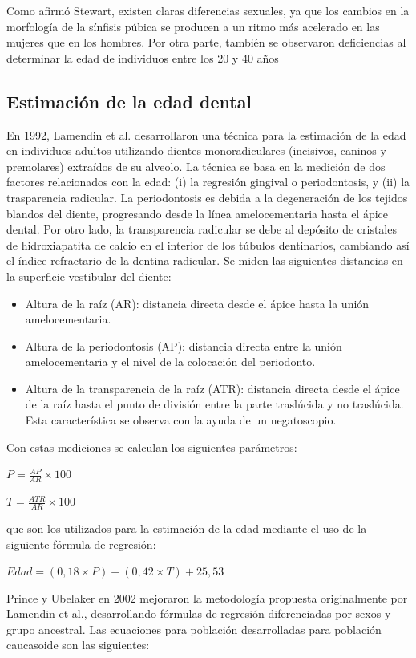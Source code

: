 \documentclass[a4paper,11pt]{article}
\begin{document}
Como afirmó Stewart, existen claras diferencias sexuales, ya que los cambios en la morfología de la sínfisis púbica se producen a un ritmo más acelerado en las mujeres que en los hombres. Por otra parte, también se observaron deficiencias al determinar la edad de individuos entre los 20 y 40 años \cite{hanihara1978estimation, suchey1979problems}
\subsection{Estimación de la edad dental}
En 1992, Lamendin et al. desarrollaron una técnica para la estimación de la edad en individuos adultos utilizando dientes monoradiculares (incisivos, caninos y premolares) extraídos de su alveolo. La técnica se basa en la medición de dos factores relacionados con la edad: (i) la regresión gingival o periodontosis, y (ii) la trasparencia radicular. La periodontosis es debida a la degeneración de los tejidos blandos del diente, progresando desde la línea amelocementaria hasta el ápice dental. Por otro lado, la transparencia radicular se debe al depósito de cristales de hidroxiapatita de calcio en el interior de los túbulos dentinarios, cambiando así el índice refractario de la dentina radicular.
Se miden las siguientes distancias en la superficie vestibular del diente:
\begin{itemize}
\item Altura de la raíz (AR): distancia directa desde el ápice hasta la unión amelocementaria.
\item Altura de la periodontosis (AP): distancia directa entre la unión amelocementaria y el nivel de la colocación del periodonto.
\item Altura de la transparencia de la raíz (ATR): distancia directa desde el ápice de la raíz hasta el punto de división entre la parte traslúcida y no traslúcida. Esta característica se observa con la ayuda de un negatoscopio.
\end{itemize}
Con estas mediciones se calculan los siguientes parámetros:
\begin{center}
$P=\frac{AP}{AR}\times 100$

$T=\frac{ATR}{AR}\times 100$
\end{center}
que son los utilizados para la estimación de la edad mediante el uso de la siguiente fórmula de regresión:
\begin{center}
$Edad=(0,18\times P)+(0,42\times T)+25,53$
\end{center}
Prince y Ubelaker en 2002 mejoraron la metodología propuesta originalmente por Lamendin et al., desarrollando fórmulas de regresión diferenciadas por sexos y grupo ancestral. Las ecuaciones para población desarrolladas para población caucasoide son las siguientes:
\end{document}
